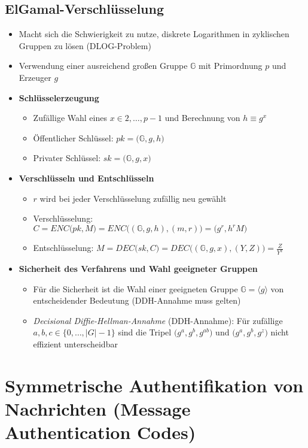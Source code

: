 \subsection{ElGamal-Verschlüsselung}
\begin{itemize}
	\item Macht sich die Schwierigkeit zu nutze, diskrete Logarithmen in zyklischen Gruppen zu lösen (DLOG-Problem)
	\item Verwendung einer ausreichend großen Gruppe \(\mathbb{G}\) mit Primordnung \(p\) und Erzeuger \(g\)
	\item \textbf{Schlüsselerzeugung}
	\begin{itemize}
		\item Zufällige Wahl eines \(x \in 2,\ldots,p-1\) und Berechnung von \(h \equiv g^x\)
		\item Öffentlicher Schlüssel: \(pk = \big(\mathbb{G},g,h\big)\)
		\item Privater Schlüssel: \(sk = \big(\mathbb{G},g,x\big)\)
	\end{itemize}
	\item \textbf{Verschlüsseln und Entschlüsseln}
	\begin{itemize}
		\item \(r\) wird bei jeder Verschlüsselung zufällig neu gewählt
		\item Verschlüsselung: \(C = ENC\big(pk,M\big) = ENC\big((\mathbb{G},g,h),(m,r)\big) = \big(g^r,h^rM\big)\)
		\item Entschlüsselung: \(M = DEC\big(sk,C\big) = DEC\big((\mathbb{G},g,x),(Y,Z)\big) = \frac{Z}{Y^x}\)
	\end{itemize}
	\item \textbf{Sicherheit des Verfahrens und Wahl geeigneter Gruppen}
	\begin{itemize}
		\item Für die Sicherheit ist die Wahl einer geeigneten Gruppe \(\mathbb{G} = \langle g \rangle\) von entscheidender Bedeutung (DDH-Annahme muss gelten)
		\item \textit{Decisional Diffie-Hellman-Annahme} (DDH-Annahme): Für zufällige \(a,b,c \in \big\{0,\ldots,|G|-1\big\}\) sind die Tripel \(\big(g^a,g^b,g^{ab}\big)\) und \(\big(g^a,g^b,g^z\big)\) nicht effizient unterscheidbar
	\end{itemize}
\end{itemize}


\section{Symmetrische Authentifikation von Nachrichten (Message Authentication Codes)}

